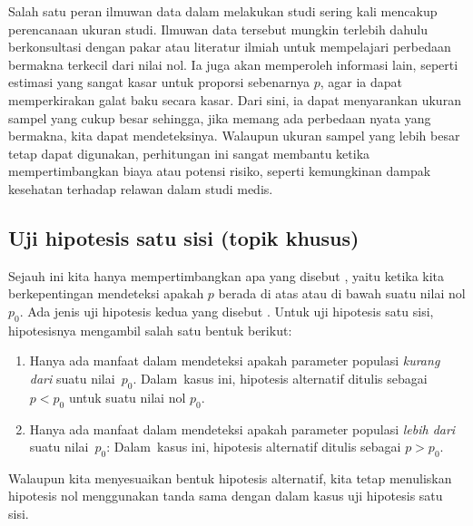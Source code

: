 
Salah satu peran ilmuwan data dalam melakukan studi sering kali
mencakup perencanaan ukuran studi.
Ilmuwan data tersebut mungkin terlebih dahulu berkonsultasi dengan pakar atau literatur
ilmiah untuk mempelajari perbedaan bermakna terkecil
dari nilai nol.
Ia juga akan memperoleh informasi lain,
seperti estimasi yang sangat kasar untuk proporsi sebenarnya $p$,
agar ia dapat memperkirakan galat baku secara kasar.
Dari sini, ia dapat menyarankan ukuran sampel yang cukup
besar sehingga, jika memang ada perbedaan nyata yang bermakna,
kita dapat mendeteksinya.
Walaupun ukuran sampel yang lebih besar tetap dapat digunakan,
perhitungan ini sangat membantu ketika mempertimbangkan
biaya atau potensi risiko, seperti kemungkinan dampak kesehatan
terhadap relawan dalam studi medis.



\subsection{Uji hipotesis satu sisi (topik khusus)}

Sejauh ini kita hanya mempertimbangkan apa yang disebut , yaitu ketika kita berkepentingan mendeteksi apakah $p$
berada di atas atau di bawah suatu nilai nol $p_0$.
Ada jenis uji hipotesis kedua yang disebut
.
Untuk uji hipotesis satu sisi,
hipotesisnya mengambil salah satu bentuk berikut:
\begin{enumerate}
\item Hanya ada manfaat dalam mendeteksi apakah parameter
    populasi \emph{kurang dari} suatu nilai~$p_0$.
    Dalam~kasus ini, hipotesis alternatif ditulis
    sebagai $p < p_0$ untuk suatu nilai nol $p_0$.
\item Hanya ada manfaat dalam mendeteksi apakah parameter
    populasi \emph{lebih dari} suatu nilai~$p_0$:
    Dalam~kasus ini, hipotesis alternatif ditulis
    sebagai $p > p_0$.
\end{enumerate}
Walaupun kita menyesuaikan bentuk hipotesis alternatif,
kita tetap menuliskan hipotesis nol menggunakan tanda sama dengan
dalam kasus uji hipotesis satu sisi.

